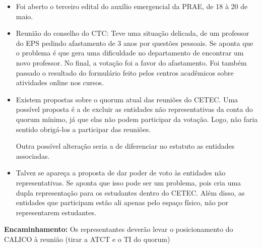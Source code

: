 \documentclass{ata-calico}
\begin{document}
\maketitle

\begin{itemize}
\item Foi aberto o terceiro edital do auxílio emergencial da PRAE, de 18 à 20 de maio.
\item Reunião do conselho do CTC: Teve uma situação delicada, de um professor do EPS pedindo afastamento de 3 anos por questões pessoais. Se aponta que o problema é que gera uma dificuldade no departamento de encontrar um novo professor. No final, a votação foi a favor do afastamento. Foi também passado o resultado do formulário feito pelos centros acadêmicos sobre atividades online nos cursos.
\end{itemize}

\begin{itemize}
\item Existem propostas sobre o quorum atual das reuniões do CETEC. Uma possível proposta é a de excluir as entidades não representativas da conta do quorum mínimo, já que elas não podem participar da votação. Logo, não faria sentido obrigá-los a participar das reuniões.

Outra possível alteração seria a de diferenciar no estatuto as entidades associadas.
\item Talvez se apareça a proposta de dar poder de voto às entidades não representativas. Se aponta que isso pode ser um problema, pois cria uma dupla representação para os estudantes dentro do CETEC. Além disso, as entidades que participam estão ali apenas pelo espaço físico, não por representarem estudantes.
\end{itemize}

\textbf{Encaminhamento:} Os representantes deverão levar o posicionamento do CALICO à reunião (tirar a ATCT e o TI do quorum)
\end{document}
